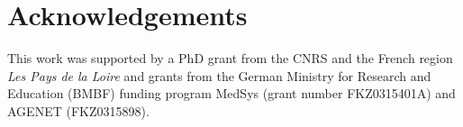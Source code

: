 \section{Acknowledgements}

This work was supported by a PhD grant from the CNRS and the French region \emph{Les Pays de la Loire} and grants from the German Ministry for Research and Education (BMBF) funding program MedSys (grant number FKZ0315401A) and AGENET (FKZ0315898).
